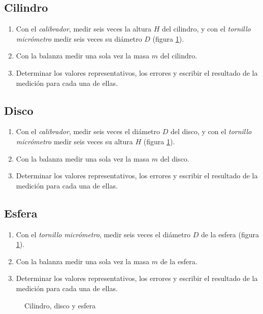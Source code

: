 \documentclass[letter,twoside,11pt]{article}
\begin{document}
\subsection{Cilindro}
\begin{enumerate}
\item Con el \emph{calibrador}, medir seis veces la altura $H$ del cilindro, y
con el \emph{tornillo micrómetro} medir seis veces su diámetro $D$ (figura
\ref{objetos}).
\item Con la balanza medir una sola vez la masa $m$ del cilindro.
\item Determinar los valores representativos, los errores y escribir el
resultado de la medición para cada una de ellas.
\end{enumerate}

\subsection{Disco}
\begin{enumerate}
\item Con el \emph{calibrador}, medir seis veces el diámetro $D$ del disco, y
con el \emph{tornillo micrómetro} medir seis veces su altura $H$ (figura
\ref{objetos}).
\item Con la balanza medir una sola vez la masa $m$ del disco.
\item Determinar los valores representativos, los errores y escribir el
resultado de la medición para cada una de ellas.
\end{enumerate}

\subsection{Esfera}
\begin{enumerate}
\item Con el \emph{tornillo micrómetro}, medir seis veces el diámetro $D$ de
la esfera (figura \ref{objetos}).
\item Con la balanza medir una sola vez la masa $m$ de la esfera.
\item Determinar los valores representativos, los errores y escribir el
resultado de la medición para cada una de ellas.
\end{enumerate}

\begin{figure}
\centering

\caption{Cilindro, disco y esfera}
\label{objetos}
\end{figure}
\end{document}
